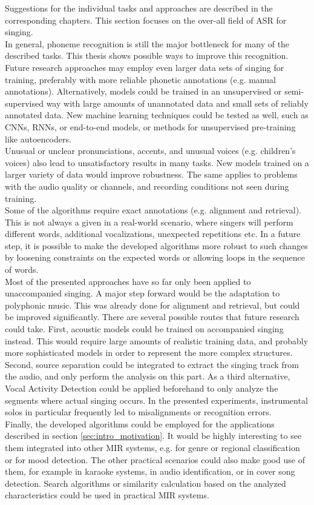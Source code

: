 Suggestions for the individual tasks and approaches are described in the corresponding chapters. This section focuses on the over-all field of ASR for singing.\\
In general, phoneme recognition is still the major bottleneck for many of the described tasks. This thesis shows possible ways to improve this recognition. Future research approaches may employ even larger data sets of singing for training, preferably with more reliable phonetic annotations (e.g. manual annotations). Alternatively, models could be trained in an unsupervised or semi-supervised way with large amounts of unannotated data and small sets of reliably annotated data. New machine learning techniques could be tested as well, such as CNNs, RNNs, or end-to-end models, or methods for unsupervised pre-training like autoencoders.\\
Unusual or unclear pronunciations, accents, and unusual voices (e.g. children's voices) also lead to unsatisfactory results in many tasks. New models trained on a larger variety of data would improve robustness. The same applies to problems with the audio quality or channels, and recording conditions not seen during training.\\

Some of the algorithms require exact annotations (e.g. alignment and retrieval). This is not always a given in a real-world scenario, where singers will perform different words, additional vocalizations, unexpected repetitions etc. In a future step, it is possible to make the developed algorithms more robust to such changes by loosening constraints on the expected words or allowing loops in the sequence of words.\\

Most of the presented approaches have so far only been applied to unaccompanied singing. A major step forward would be the adaptation to polyphonic music. This was already done for alignment and retrieval, but could be improved significantly. There are several possible routes that future research could take. First, acoustic models could be trained on accompanied singing instead. This would require large amounts of realistic training data, and probably more sophisticated models in order to represent the more complex structures. Second, source separation could be integrated to extract the singing track from the audio, and only perform the analysis on this part. As a third alternative, Vocal Activity Detection could be applied beforehand to only analyze the segments where actual singing occurs. In the presented experiments, instrumental solos in particular frequently led to misalignments or recognition errors.\\

Finally, the developed algorithms could be employed for the applications described in section \ref{sec:intro_motivation}. It would be highly interesting to see them integrated into other MIR systems, e.g. for genre or regional classification or for mood detection. The other practical scenarios could also make good use of them, for example in karaoke systems, in audio identification, or in cover song detection. Search algorithms or similarity calculation based on the analyzed characteristics could be used in practical MIR systems.
